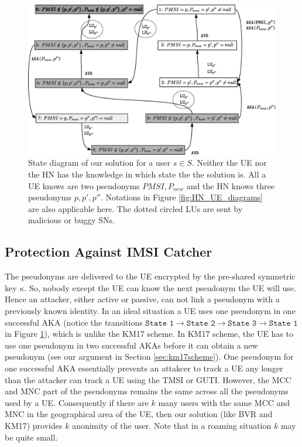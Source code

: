 \documentclass{llncs} %
\begin{document}
\begin{figure}[!tbp]
  \centering
    \includegraphics[width=.95\textwidth]{solution_diagram.eps}
 \caption{State diagram of our solution for a user $s \in S$. Neither the UE nor the HN has the knowledge in which state the the solution is. All a UE knows are two pseudonyms $PMSI,P_{new}$ and the HN knows three pseudonyms $p,p',p''$. Notations in Figure \ref{fig:HN_UE_diagrams} are also applicable here. The dotted circled LUs are sent by malicious or buggy SNs.}
  \label{fig:solution_diagram}
\end{figure}



\subsection{Protection Against IMSI Catcher} The pseudonyms are delivered to the UE encrypted by the pre-shared symmetric key $\kappa$. So, nobody except the UE can know the next pseudonym the UE will use. Hence an attacker, either active or passive, can not link a pseudonym with a previously known identity. In an ideal situation a UE uses one pseudonym in one successful AKA (notice the transitions $ \texttt{State 1} \rightarrow \texttt{State 2} \rightarrow \texttt{State 3} \rightarrow \texttt{State 1}$ in Figure \ref{fig:solution_diagram}), which is unlike the KM17 scheme. In KM17 scheme, the UE has to use one pseudonym in two successful AKAs before it can obtain a new pseudonym (see our argument in Section \ref{sec:km17scheme}). One pseudonym for one successful AKA essentially prevents an attakcer to track a UE any longer than the attacker can track a UE using the TMSI or GUTI. However, the MCC and MNC part of the pseudonyms remains the same across all the pseudonyms used by a UE. Consequently if there are $k$ many users with the same MCC and MNC in the geographical area of the UE, then our solution (like BVR and KM17) provides $k$ anonimity of the user. Note that in a roaming situation $k$ may be quite small.
\end{document}
